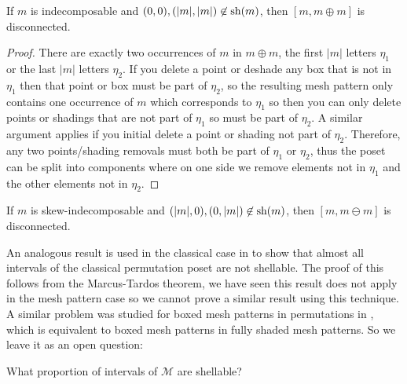 \documentclass[11pt,a4paper,oneside]{article}
\begin{document}
\begin{lem}
If $m$ is indecomposable and $(0,0),(|m|,|m|)\not\in\operatorname{\textrm{sh}}(m)$, then
$[m,m\oplus m]$ is disconnected.
\begin{proof}
There are exactly two occurrences of $m$ in $m\oplus m$, the first $|m|$ letters
$\eta_1$ or the last $|m|$ letters $\eta_2$. If you delete a point or deshade
any box that is not in $\eta_1$ then that point or box must be part of $\eta_2$,
so the resulting mesh pattern only contains one occurrence of $m$ which
corresponds to $\eta_1$ so then you can only delete points or shadings that are
not part of $\eta_1$ so must be part of $\eta_2$. A similar argument applies if
you initial delete a point or shading not part of $\eta_2$. Therefore, any two
points/shading removals must both be part of $\eta_1$ or $\eta_2$, thus the
poset can be split into components where on one side we remove elements not in
$\eta_1$ and the other elements not in $\eta_2$.
\end{proof}
\end{lem}
\begin{cor}
If $m$ is skew-indecomposable and $(|m|,0),(0,|m|)\not\in\operatorname{\textrm{sh}}(m)$, then
$[m,m\ominus m]$ is disconnected.
\end{cor}

An analogous result is used in the classical case in \cite{McSt13} to show that
almost all intervals of the classical permutation poset are not shellable. The
proof of this follows from the Marcus-Tardos theorem, we have seen this result
does not apply in the mesh pattern case so we cannot prove a similar result
using this technique.  A similar problem was studied for boxed mesh patterns in
permutations in \cite{AKV13}, which is equivalent to boxed mesh patterns in
fully shaded mesh patterns. So we leave it as an open question:

\begin{que}
What proportion of intervals of $\mathcal{M}$ are shellable?
\end{que}




\end{document}
